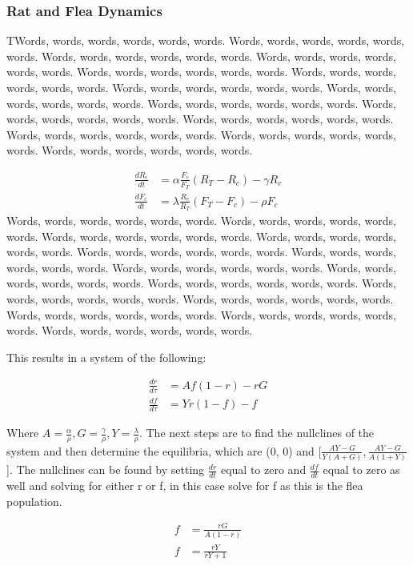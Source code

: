 \documentclass [letterpaper, 12pt] {article}
\begin{document}
\subsubsection {Rat and Flea Dynamics}
TWords, words, words, words, words, words. Words, words, words, words, words, words. Words, words, words, words, words, words. Words, words, words, words, words, words. Words, words, words, words, words, words. Words, words, words, words, words, words. Words, words, words, words, words, words. Words, words, words, words, words, words. Words, words, words, words, words, words. Words, words, words, words, words, words. Words, words, words, words, words, words. Words, words, words, words, words, words. Words, words, words, words, words, words. Words, words, words, words, words, words. 


\begin{align}
	\frac{dR_c}{dt} &= \alpha \frac{F_c}{F_T} (R_T-R_c)  - \gamma R_c \\
	\frac{dF_c}{dt} &= \lambda \frac{R_c}{R_T} (F_T-F_c) - \rho F_c 
\end{align}
Words, words, words, words, words, words. Words, words, words, words, words, words. Words, words, words, words, words, words. Words, words, words, words, words, words. Words, words, words, words, words, words. Words, words, words, words, words, words. Words, words, words, words, words, words. Words, words, words, words, words, words. Words, words, words, words, words, words. Words, words, words, words, words, words. Words, words, words, words, words, words. Words, words, words, words, words, words. Words, words, words, words, words, words. Words, words, words, words, words, words. 


This results in a system of the following:

\begin{align}
	\frac{dr}{d\tau} &= Af(1-r)-rG \\
	\frac{df}{d\tau} &= Yr(1-f)-f
\end{align}

Where $A=\frac{\alpha}{\rho}, G=\frac{\gamma}{\rho},
Y=\frac{\lambda}{\rho}$.
The next steps are to find the nullclines of the system and then determine the equilibria, which are
(0, 0) and [$\frac{AY-G}{Y(A+G)}, \frac{AY-G}{A(1+Y)}$]. The nullclines can be found by setting
$\frac{dr}{dt}$ equal to zero and $\frac{df}{dt}$ equal to zero as well and solving for either r or f,
in this case solve for f as this is the flea population.

\begin{align}
	f &= \frac{rG}{A(1-r)} \\
	f &= \frac{rY}{rY+1}
\end{align}
\end{document}
